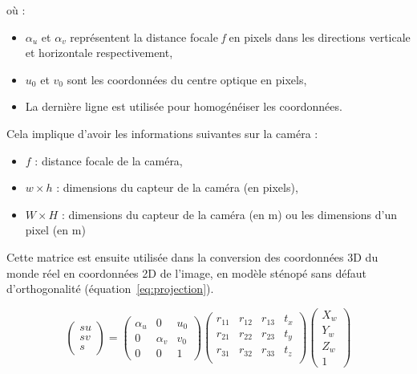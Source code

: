 \documentclass[12pt]{article}
\begin{document}
où :
\begin{itemize}
    \item $\alpha_{u}$ et $\alpha_{v}$ représentent la distance focale \textit{f} en pixels dans les directions verticale et horizontale respectivement,
    \item $u_0$ et $v_0$ sont les coordonnées du centre optique en pixels,
    \item La dernière ligne est utilisée pour homogénéiser les coordonnées.
\end{itemize}
\vspace{1cm}

Cela implique d'avoir les informations suivantes sur la caméra :
\begin{itemize}
    \item $f$ : distance focale de la caméra,
    \item $w \times h$ : dimensions du capteur de la caméra (en pixels),
    \item $W \times H$ : dimensions du capteur de la caméra (en m) ou les dimensions d'un pixel (en m)
\end{itemize}
\vspace{1cm}

Cette matrice est ensuite utilisée dans la conversion des coordonnées 3D du monde réel en coordonnées 2D de l'image, 
en modèle sténopé sans défaut d'orthogonalité (équation~\ref{eq:projection}).

\begin{equation}
\label{eq:projection}
\begin{pmatrix}
su \\
sv \\
s
\end{pmatrix} = 
\begin{pmatrix}
\alpha_{u} & 0 & u_0 \\
0 & \alpha_{v} & v_0 \\
0 & 0 & 1
\end{pmatrix}
\begin{pmatrix}
r_{11} & r_{12} & r_{13} & t_x \\
r_{21} & r_{22} & r_{23} & t_y \\
r_{31} & r_{32} & r_{33} & t_z \\
\end{pmatrix}
\begin{pmatrix}
X_w \\
Y_w \\
Z_w \\
1
\end{pmatrix}
\end{equation}
\end{document}
